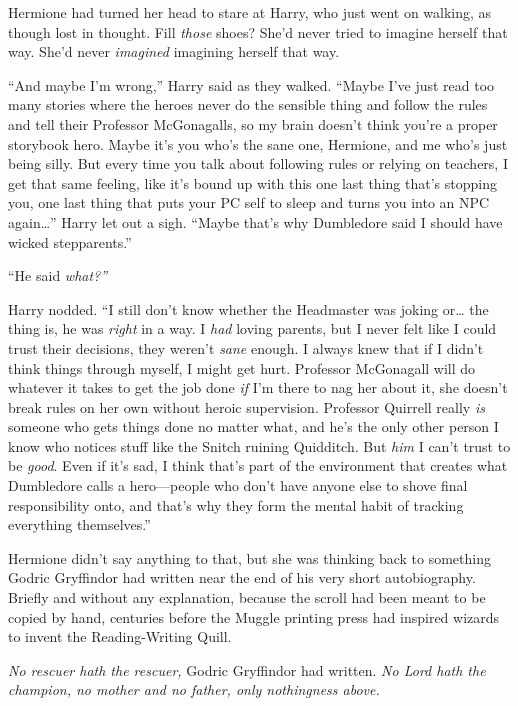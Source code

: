 Hermione had turned her head to stare at Harry, who just went on
walking, as though lost in thought. Fill \emph{those} shoes? She'd never
tried to imagine herself that way. She'd never \emph{imagined} imagining
herself that way.

``And maybe I'm wrong,'' Harry said as they walked. ``Maybe I've just
read too many stories where the heroes never do the sensible thing and
follow the rules and tell their Professor McGonagalls, so my brain
doesn't think you're a proper storybook hero. Maybe it's you who's the
sane one, Hermione, and me who's just being silly. But every time you
talk about following rules or relying on teachers, I get that same
feeling, like it's bound up with this one last thing that's stopping
you, one last thing that puts your PC self to sleep and turns you into
an NPC again\ldots{}'' Harry let out a sigh. ``Maybe that's why
Dumbledore said I should have wicked stepparents.''

``He said \emph{what?''}

Harry nodded. ``I still don't know whether the Headmaster was joking
or\ldots{} the thing is, he was \emph{right} in a way. I \emph{had}
loving parents, but I never felt like I could trust their decisions,
they weren't \emph{sane} enough. I always knew that if I didn't think
things through myself, I might get hurt. Professor McGonagall will do
whatever it takes to get the job done \emph{if} I'm there to nag her
about it, she doesn't break rules on her own without heroic supervision.
Professor Quirrell really \emph{is} someone who gets things done no
matter what, and he's the only other person I know who notices stuff
like the Snitch ruining Quidditch. But \emph{him} I can't trust to be
\emph{good}. Even if it's sad, I think that's part of the environment
that creates what Dumbledore calls a hero---people who don't have anyone
else to shove final responsibility onto, and that's why they form the
mental habit of tracking everything themselves.''

Hermione didn't say anything to that, but she was thinking back to
something Godric Gryffindor had written near the end of his very short
autobiography. Briefly and without any explanation, because the scroll
had been meant to be copied by hand, centuries before the Muggle
printing press had inspired wizards to invent the Reading-Writing Quill.

\emph{No rescuer hath the rescuer,} Godric Gryffindor had written.
\emph{No Lord hath the champion, no mother and no father, only
nothingness above.}

